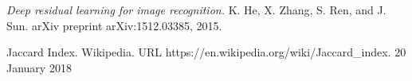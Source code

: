 \documentclass[a4paper, twoside]{article}
\begin{document}
\begin{thebibliography}{99}
	\textit{Deep residual learning for image recognition.}
    K. He, X. Zhang, S. Ren, and J. Sun. 
    arXiv preprint arXiv:1512.03385, 2015.

    
	Jaccard Index. Wikipedia.
    URL https://en.wikipedia.org/wiki/Jaccard{\_}index. 
    20 January 2018





\end{thebibliography}
\end{document}
